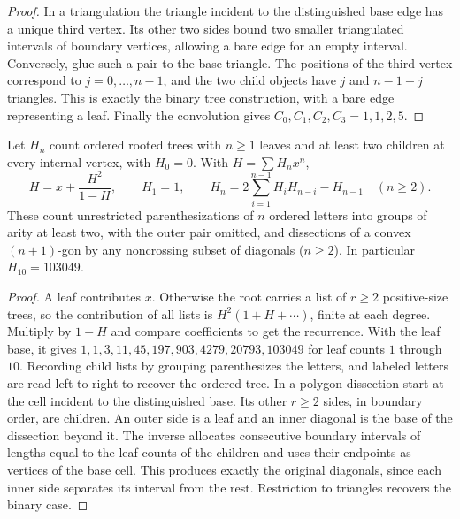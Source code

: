 \begin{proof}
In a triangulation the triangle incident to the distinguished base edge
has a unique third vertex. Its other two sides bound two smaller
triangulated intervals of boundary vertices, allowing a bare edge for an
empty interval. Conversely, glue such a pair to the base triangle.
The positions of the third vertex correspond to $j=0,\ldots,n-1$, and
the two child objects have $j$ and $n-1-j$ triangles. This is exactly
the binary tree construction, with a bare edge representing a leaf.
Finally the convolution gives $C_0,C_1,C_2,C_3=1,1,2,5$.
\end{proof}

\begin{proposition}\label{result12}
Let $H_n$ count ordered rooted trees with $n\ge1$ leaves and at least two
children at every internal vertex, with $H_0=0$. With $H=\sum H_nx^n$,
\[
 H=x+\frac{H^2}{1-H},\qquad
 H_1=1,\qquad H_n=2\sum_{i=1}^{n-1}H_iH_{n-i}-H_{n-1}\quad(n\ge2).
\]
These count unrestricted parenthesizations of $n$ ordered letters into
groups of arity at least two, with the outer pair omitted, and dissections
of a convex $(n+1)$-gon by any noncrossing subset of diagonals ($n\ge2$).
In particular $H_{10}=103049$.
\end{proposition}
\begin{proof}
A leaf contributes $x$. Otherwise the root carries a list of $r\ge2$
positive-size trees, so the contribution of all lists is
$H^2(1+H+\cdots)$, finite at each degree. Multiply by $1-H$ and compare
coefficients to get the recurrence. With the leaf base, it gives
$1,1,3,11,45,197,903,4279,20793,103049$ for leaf counts $1$ through $10$.
Recording child lists by grouping parenthesizes the letters, and labeled
letters are read left to right to recover the ordered tree.
In a polygon dissection start at the cell incident to the distinguished
base. Its other $r\ge2$ sides, in boundary order, are children. An outer
side is a leaf and an inner diagonal is the base of the dissection beyond
it. The inverse allocates consecutive boundary intervals of lengths equal
to the leaf counts of the children and uses their endpoints as vertices
of the base cell. This produces exactly the original diagonals, since
each inner side separates its interval from the rest. Restriction to
triangles recovers the binary case.
\end{proof}

